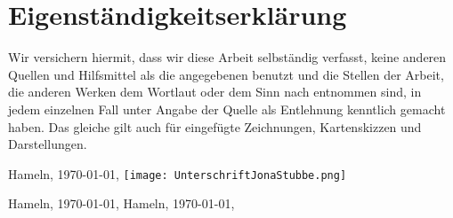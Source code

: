\documentclass[a4paper,12pt,titlepage]{article}
\begin{document}
\part{Eigenständigkeitserklärung}
Wir versichern hiermit, dass wir diese Arbeit selbständig verfasst, keine anderen Quellen und Hilfsmittel
als die angegebenen benutzt und die Stellen der Arbeit, die anderen Werken dem Wortlaut oder dem Sinn nach entnommen sind,
in jedem einzelnen Fall unter Angabe der Quelle als Entlehnung kenntlich gemacht haben.
Das gleiche gilt auch für eingefügte Zeichnungen, Kartenskizzen und Darstellungen.

Hameln, \today, \texttt{[image: UnterschriftJonaStubbe.png]}

Hameln, \today, 
Hameln, \today,
\end{document}
